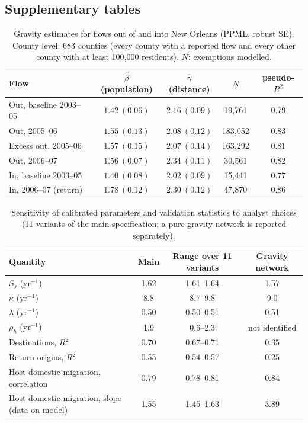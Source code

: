 \documentclass[11pt]{article}
\begin{document}
\subsection{Supplementary tables}
\begin{table}[h]
\centering\small
\caption{Gravity estimates for flows out of and into New Orleans (PPML, robust SE). County level: 683 counties (every county with a reported flow and every other county with at least 100{,}000 residents). $N$: exemptions modelled.}
\label{tab:gravity}
\begin{tabular}{lcccc}
\toprule
Flow & $\hat\beta$ (population) & $\hat\gamma$ (distance) & $N$ & pseudo-$R^2$\\
\midrule
Out, baseline 2003--05 & $1.42\ (0.06)$ & $2.16\ (0.09)$ & 19{,}761 & 0.79\\
Out, 2005--06 & $1.55\ (0.13)$ & $2.08\ (0.12)$ & 183{,}052 & 0.83\\
Excess out, 2005--06 & $1.57\ (0.15)$ & $2.07\ (0.14)$ & 163{,}292 & 0.81\\
Out, 2006--07 & $1.56\ (0.07)$ & $2.34\ (0.11)$ & 30{,}561 & 0.82\\
In, baseline 2003--05 & $1.40\ (0.08)$ & $2.02\ (0.09)$ & 15{,}441 & 0.77\\
In, 2006--07 (return) & $1.78\ (0.12)$ & $2.30\ (0.12)$ & 47{,}870 & 0.86\\
\bottomrule
\end{tabular}
\end{table}

\begin{table}[h]
\centering\small
\caption{Sensitivity of calibrated parameters and validation statistics to analyst choices (11 variants of the main specification; a pure gravity network is reported separately).}
\label{tab:sens}
\begin{tabular}{lccc}
\toprule
Quantity & Main & Range over 11 variants & Gravity network\\
\midrule
$S_s$ (yr$^{-1}$) & 1.62 & 1.61--1.64 & 1.57\\
$\kappa$ (yr$^{-1}$) & 8.8 & 8.7--9.8 & 9.0\\
$\lambda$ (yr$^{-1}$) & 0.50 & 0.50--0.51 & 0.51\\
$\rho_h$ (yr$^{-1}$) & 1.9 & 0.6--2.3 & not identified\\
Destinations, $R^2$ & 0.70 & 0.67--0.71 & 0.35\\
Return origins, $R^2$ & 0.55 & 0.54--0.57 & 0.25\\
Host domestic migration, correlation & 0.79 & 0.78--0.81 & 0.84\\
Host domestic migration, slope (data on model) & 1.55 & 1.45--1.63 & 3.89\\
\bottomrule
\end{tabular}
\end{table}
\end{document}
